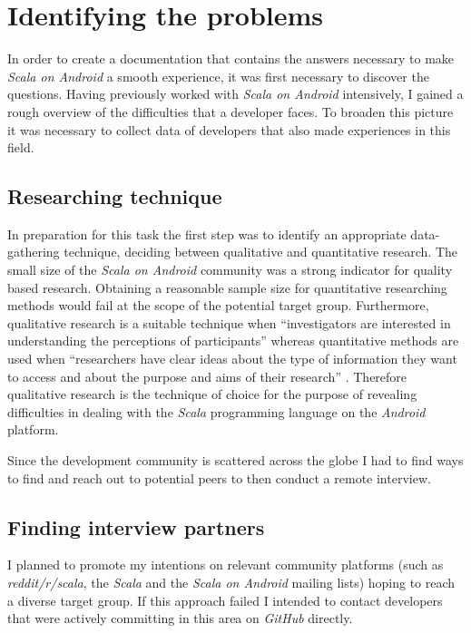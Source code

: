 \section{Identifying the problems}

In order to create a documentation that contains the answers necessary to make \textit{Scala on Android} a smooth experience, it was first necessary to discover the questions. Having previously worked with \textit{Scala on Android} intensively, I gained a rough overview of the difficulties that a developer faces. To broaden this picture it was necessary to collect data of developers that also made experiences in this field.

\subsection{Researching technique}

In preparation for this task the first step was to identify an appropriate data-gathering technique, deciding between qualitative and quantitative research. The small size of the \textit{Scala on Android} community was a strong indicator for quality based research. Obtaining a reasonable sample size for quantitative researching methods would fail at the scope of the potential target group. Furthermore, qualitative research is a suitable technique when \enquote{investigators are interested in understanding the perceptions of participants} \cite[p. 72]{berg01} whereas quantitative methods are used when \enquote{researchers have clear ideas about the type of information they want to access and about the purpose and aims of their research} \cite[p. 72]{berg01}. Therefore qualitative research is the technique of choice for the purpose of revealing difficulties in dealing with the \textit{Scala} programming language on the \textit{Android} platform.

Since the development community is scattered across the globe I had to find ways to find and reach out to potential peers to then conduct a remote interview.

\subsection{Finding interview partners}

I planned to promote my intentions on relevant community platforms (such as \textit{reddit/r/scala}, the \textit{Scala} and the \textit{Scala on Android} mailing lists) hoping to reach a diverse target group. If this approach failed I intended to contact developers that were actively committing in this area on \textit{GitHub} directly.

